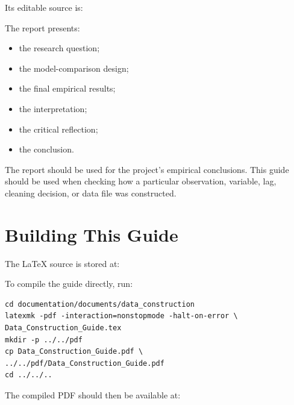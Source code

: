 \documentclass[11pt,a4paper]{article}
\begin{document}
Its editable source is:

\begin{center}
\end{center}

The report presents:

\begin{itemize}
  \item the research question;
  \item the model-comparison design;
  \item the final empirical results;
  \item the interpretation;
  \item the critical reflection;
  \item the conclusion.
\end{itemize}

The report should be used for the project's empirical conclusions. This guide
should be used when checking how a particular observation, variable, lag,
cleaning decision, or data file was constructed.


\section{Building This Guide}

The LaTeX source is stored at:

\begin{center}
\end{center}

To compile the guide directly, run:

\begin{verbatim}
cd documentation/documents/data_construction
latexmk -pdf -interaction=nonstopmode -halt-on-error \
Data_Construction_Guide.tex
mkdir -p ../../pdf
cp Data_Construction_Guide.pdf \
../../pdf/Data_Construction_Guide.pdf
cd ../../..
\end{verbatim}

The compiled PDF should then be available at:

\begin{center}
\end{center}
\end{document}
